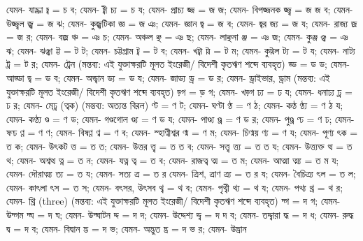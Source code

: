 \documentclass[10pt]{article}
\begin{document}
                    যেমন- যাচ্ঞা চ্ব = চ ব;
                    যেমন- চ্বী চ্য = চ য;
                    যেমন- প্রাচ্য জ্জ = জ জ;
                    যেমন- বিপজ্জনক জ্জ্ব = জ জ ব;
                    যেমন- উজ্জ্বল জ্ঝ = জ ঝ;
                    যেমন- কুজ্ঝটিকা জ্ঞ = জ ঞ;
                    যেমন- জ্ঞান জ্ব = জ ব;
                    যেমন- জ্বর জ্য = জ য;
                    যেমন- রাজ্য জ্র = জ র;
                    যেমন- বজ্র ঞ্চ = ঞ চ;
                    যেমন- অঞ্চল ঞ্ছ = ঞ ছ;
                    যেমন- লাঞ্ছনা ঞ্জ = ঞ জ;
                    যেমন- কুঞ্জ ঞ্ঝ = ঞ ঝ;
                    যেমন- ঝঞ্ঝা ট্ট = ট ট;
                    যেমন- চট্টগ্রাম ট্ব = ট ব;
                    যেমন- খট্বা ট্ম = ট ম;
                    যেমন- কুট্মল ট্য = ট য;
                    যেমন- নাট্য ট্র = ট র;
                    যেমন- ট্রেন (মন্তব্য: এই যুক্তাক্ষরটি মূলত ইংরেজী/ বিদেশী কৃতঋণ শব্দে ব্যবহৃত) ড্ড = ড ড;
                    যেমন- আড্ডা ড্ব = ড ব;
                    যেমন- অন্ড্বান ড্য = ড য;
                    যেমন- জাড্য ড্র = ড র;
                    যেমন- ড্রাইভার, ড্রাম (মন্তব্য: এই যুক্তাক্ষরটি মূলত ইংরেজী/ বিদেশী কৃতঋণ শব্দে ব্যবহৃত) ড়্গ = ড় গ;
                    যেমন- খড়্গ ঢ্য = ঢ য;
                    যেমন- ধনাঢ্য ঢ্র = ঢ র;
                    যেমন- মেঢ্র (ত্বক) (মন্তব্য: অত্যন্ত বিরল) ণ্ট = ণ ট;
                    যেমন- ঘণ্টা ণ্ঠ = ণ ঠ;
                    যেমন- কণ্ঠ ণ্ঠ্য = ণ ঠ য;
                    যেমন- কণ্ঠ্য ণ্ড = ণ ড;
                    যেমন- গণ্ডগোল ণ্ড্য = ণ ড য;
                    যেমন- পাণ্ড্য ণ্ড্র = ণ ড র;
                    যেমন- পুণ্ড্র ণ্ঢ = ণ ঢ;
                    যেমন- ষণ্ঢ ণ্ণ = ণ ণ;
                    যেমন- বিষণ্ণ ণ্ব = ণ ব;
                    যেমন- স্হাণ্বীশ্বর ণ্ম = ণ ম;
                    যেমন- চিণ্ময় ণ্য = ণ য;
                    যেমন- পূণ্য ৎক = ত ক;
                    যেমন- উৎকট ত্ত = ত ত;
                    যেমন- উত্তর ত্ত্ব = ত ত ব;
                    যেমন- সত্ত্ব ত্ত্য = ত ত য;
                    যেমন- উত্ত্যক্ত ত্থ = ত থ;
                    যেমন- অশ্বত্থ ত্ন = ত ন;
                    যেমন- যত্ন ত্ব = ত ব;
                    যেমন- রাজত্ব ত্ম = ত ম;
                    যেমন- আত্মা ত্ম্য = ত ম য;
                    যেমন- দৌরাত্ম্য ত্য = ত য;
                    যেমন- সত্য ত্র = ত র
                    যেমন- ত্রিশ, ত্রাণ ত্র্য = ত র য;
                    যেমন- বৈচিত্র্য ৎল = ত ল;
                    যেমন- কাৎলা ৎস = ত স;
                    যেমন- বৎসর, উৎসব থ্ব = থ ব;
                    যেমন- পৃথ্বী থ্য = থ য;
                    যেমন- পথ্য থ্র = থ র;
                    যেমন- থ্রি (three) (মন্তব্য: এই যুক্তাক্ষরটি মূলত ইংরেজী/ বিদেশী কৃতঋণ শব্দে ব্যবহৃত) দ্গ = দ গ;
                    যেমন- উদ্গম দ্ঘ = দ ঘ;
                    যেমন- উদ্ঘাটন দ্দ = দ দ;
                    যেমন- উদ্দেশ্য দ্দ্ব = দ দ ব;
                    যেমন- তদ্দ্বারা দ্ধ = দ ধ;
                    যেমন- রুদ্ধ দ্ব = দ ব;
                    যেমন- বিদ্বান দ্ভ = দ ভ;
                    যেমন- অদ্ভুত দ্ভ্র = দ ভ র;
                    যেমন- উদ্ভ্রান
\end{document}
